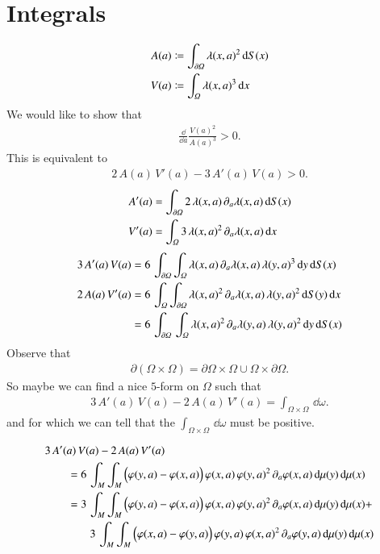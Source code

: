 \newpage
\section{Integrals}

\begin{align*}
	A(a) &\coloneqq  \int_{\partial\varOmega} \lambda(x,a)^2 \, {\operatorname{d}} S(x)
	\\
	V(a) &\coloneqq  \int_\varOmega  \lambda(x,a)^3 \, {\operatorname{d}} x
\end{align*}
We would like to show that
\begin{align*}
	\frac{\dd}{\dd a} \frac{V(a)^2}{A(a)^3} > 0.
\end{align*}
This is equivalent to
\begin{align*}
	2 \, A(a) \, V'(a) - 3 \, A'(a) \, V(a) >0.
\end{align*}
\begin{align*}
	A'(a) &= \int_{\partial\varOmega}  2 \, \lambda(x,a) \, \partial_a\lambda(x,a) \, {\operatorname{d}} S(x)
	\\
	V'(a) &= \int_\varOmega  3 \, \lambda(x,a)^2 \, \partial_a\lambda(x,a) \, {\operatorname{d}} x
\end{align*}
\begin{align*}
	3 \, A'(a) \, V(a)
	&=
	6 \, \int_{\partial \varOmega} \int_\varOmega
		\lambda(x,a) \, \partial_a\lambda(x,a) \,
		\lambda(y,a)^3
	\, {\operatorname{d}} y \, {\operatorname{d}} S(x)
	\\
	2 \, A(a) \, V'(a)
	&=
	6 \, \int_\varOmega \int_{\partial\varOmega}
		\lambda(x,a)^2 \, \partial_a\lambda(x,a) \, \lambda(y,a)^2
	\, {\operatorname{d}} S(y) \, {\operatorname{d}} x
	\\
	&=
	6 \, \int_{\partial\varOmega} \, \int_\varOmega
		\lambda(x,a)^2 \, \partial_a\lambda(y,a) \, \lambda(y,a)^2
	\, {\operatorname{d}} y \, {\operatorname{d}} S(x)	
\end{align*}
Observe that 
\begin{align*}
	\partial ( \varOmega \times \varOmega) = \partial \varOmega \times \varOmega \cup \varOmega \times \partial \varOmega.
\end{align*}
So maybe we can find a nice $5$-form on $\varOmega$ such that
\begin{align*}
	3 \, A'(a) \, V(a)
	-
	2 \, A(a) \, V'(a)
	=
	\int_{\varOmega \times \varOmega} \, \dd \omega.
\end{align*}
and for which we can tell that the $\int_{\varOmega \times \varOmega} \, \dd \omega$ must be positive.

\begin{align*}
	\MoveEqLeft
	3 \, A'(a) \, V(a)
	-
	2 \, A(a) \, V'(a)
	\\
	&=
	6 \, 
	\int_M \int_M
	\Bigparen{
		\varphi(y,a)
		- \varphi(x,a)
	} \, \varphi(x,a) \, \varphi(y,a)^2
	\,  \pd_a\varphi(x,a)
	\, \dd \mu(y) \, \dd \mu(x)
	\\
	&=
	3 \, 
	\int_M \int_M
	\Bigparen{
		\varphi(y,a)
		- \varphi(x,a)
	} \, \varphi(x,a) \, \varphi(y,a)^2
	\,  \pd_a\varphi(x,a)
	\, \dd \mu(y) \, \dd \mu(x)
	+
	\\
	&\qquad
	3 \, 
	\int_M \int_M
	\Bigparen{
		\varphi(x,a)
		- \varphi(y,a)
	} \, \varphi(y,a) \, \varphi(x,a)^2
	\,  \pd_a\varphi(y,a)
	\, \dd \mu(y) \, \dd \mu(x)		
\end{align*}


